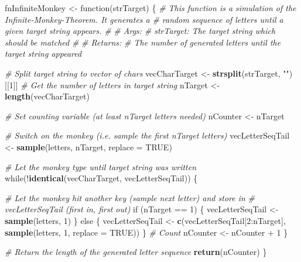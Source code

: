 \documentclass[10pt,]{article}
\newenvironment{Shaded}{\begin{snugshade}}{\end{snugshade}}
\newcommand{\KeywordTok}[1]{\textcolor[rgb]{0.13,0.29,0.53}{\textbf{{#1}}}}
\newcommand{\DataTypeTok}[1]{\textcolor[rgb]{0.13,0.29,0.53}{{#1}}}
\newcommand{\DecValTok}[1]{\textcolor[rgb]{0.00,0.00,0.81}{{#1}}}
\newcommand{\StringTok}[1]{\textcolor[rgb]{0.31,0.60,0.02}{{#1}}}
\newcommand{\CommentTok}[1]{\textcolor[rgb]{0.56,0.35,0.01}{\textit{{#1}}}}
\newcommand{\OtherTok}[1]{\textcolor[rgb]{0.56,0.35,0.01}{{#1}}}
\newcommand{\NormalTok}[1]{{#1}}
\begin{document}
\begin{Shaded}
\begin{Highlighting}[]
\NormalTok{fnInfiniteMonkey <-}\StringTok{ }\NormalTok{function(strTarget) \{}
  \CommentTok{# This function is a simulation of the Infinite-Monkey-Theorem. It generates a}
  \CommentTok{# random sequence of letters until a given target string appears.}
  \CommentTok{# }
  \CommentTok{# Args:}
  \CommentTok{#   strTarget: The target string which should be matched}
  \CommentTok{#   }
  \CommentTok{# Returns:}
  \CommentTok{#   The number of generated letters until the target string appeared}
  
  \CommentTok{# Split target string to vector of chars}
  \NormalTok{vecCharTarget <-}\StringTok{ }\KeywordTok{strsplit}\NormalTok{(strTarget, }\StringTok{""}\NormalTok{)[[}\DecValTok{1}\NormalTok{]]}
  \CommentTok{# Get the number of letters in target string}
  \NormalTok{nTarget <-}\StringTok{ }\KeywordTok{length}\NormalTok{(vecCharTarget)}
  
  \CommentTok{# Set counting variable (at least nTarget letters needed)}
  \NormalTok{nCounter <-}\StringTok{ }\NormalTok{nTarget}
  
  \CommentTok{# Switch on the monkey (i.e. sample the first nTarget letters)}
  \NormalTok{vecLetterSeqTail <-}\StringTok{ }\KeywordTok{sample}\NormalTok{(letters, nTarget, }\DataTypeTok{replace =} \OtherTok{TRUE}\NormalTok{)}
  
  \CommentTok{# Let the monkey type until target string was written}
  \NormalTok{while(!}\KeywordTok{identical}\NormalTok{(vecCharTarget, vecLetterSeqTail)) \{}
    
    \CommentTok{# Let the monkey hit another key (sample next letter) and store in }
    \CommentTok{# vecLetterSeqTail (first in, first out)}
    \NormalTok{if (nTarget ==}\StringTok{ }\DecValTok{1}\NormalTok{) \{}
      \NormalTok{vecLetterSeqTail <-}\StringTok{ }\KeywordTok{sample}\NormalTok{(letters, }\DecValTok{1}\NormalTok{)}
    \NormalTok{\} else \{}
      \NormalTok{vecLetterSeqTail <-}\StringTok{ }\KeywordTok{c}\NormalTok{(vecLetterSeqTail[}\DecValTok{2}\NormalTok{:nTarget], }
                            \KeywordTok{sample}\NormalTok{(letters, }\DecValTok{1}\NormalTok{, }\DataTypeTok{replace =} \OtherTok{TRUE}\NormalTok{))}
    \NormalTok{\}}
    \CommentTok{# Count}
    \NormalTok{nCounter <-}\StringTok{ }\NormalTok{nCounter +}\StringTok{ }\DecValTok{1}
  \NormalTok{\}}
  
  \CommentTok{# Return the length of the generated letter sequence}
  \KeywordTok{return}\NormalTok{(nCounter)}
\NormalTok{\}}
\end{Highlighting}
\end{Shaded}
\end{document}

